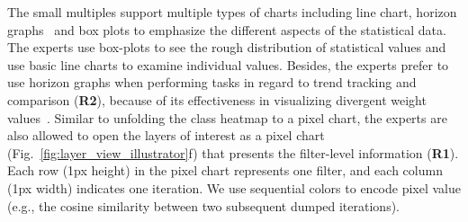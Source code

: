 \documentclass[format=acmsmall, review=false, screen=true]{acmart}
\begin{document}
The small multiples support multiple types of charts including line chart, horizon graphs~\cite{heer2010tour} and box plots to emphasize the different aspects of the statistical data.
The experts use box-plots to see the rough distribution of statistical values and use basic line charts to examine individual values. Besides, the experts prefer to use horizon graphs when performing tasks in regard to trend tracking and comparison (\textbf{R2}), because of its effectiveness in visualizing divergent weight values~\cite{javed2010graphical}.
Similar to unfolding the class heatmap to a pixel chart, the experts are also allowed to open the layers of interest as a pixel chart (Fig.~\ref{fig:layer_view_illustrator}f) that presents the filter-level information (\textbf{R1}). Each row (1px height) in the pixel chart represents one filter, and each column (1px width) indicates one iteration. We use sequential colors to encode pixel value (e.g., the cosine similarity between two subsequent dumped iterations).
\end{document}
